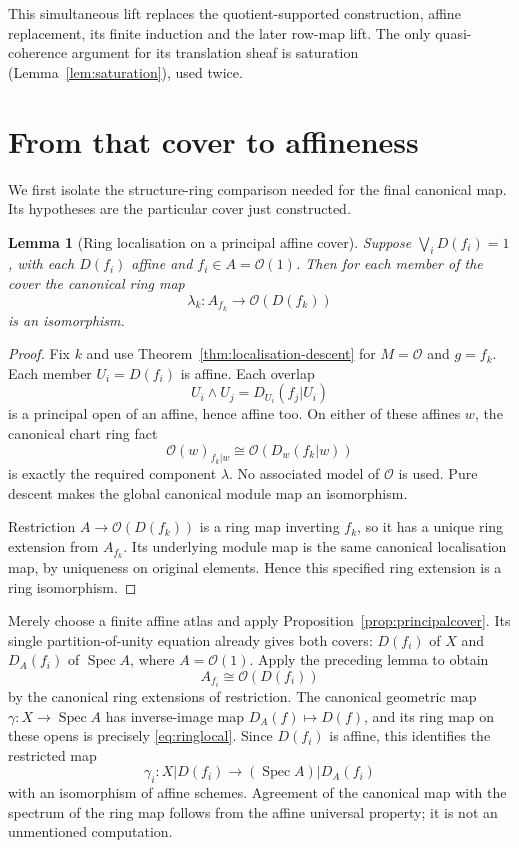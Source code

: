\documentclass[11pt]{amsart}
\newtheorem{lemma}[theorem]{Lemma}
\theoremstyle{definition}\newtheorem{definition}[theorem]{Definition}
\theoremstyle{remark}\newtheorem{remark}[theorem]{Remark}
\newcommand{\OO}{\mathcal O}
\newcommand{\Spec}{\operatorname{Spec}}
\begin{document}
This simultaneous lift replaces the quotient-supported construction,
affine replacement, its finite induction and the later row-map lift.
The only quasi-coherence argument for its translation sheaf is
saturation (Lemma~\ref{lem:saturation}), used twice.

\section{From that cover to affineness}\label{sec:finish}
We first isolate the structure-ring comparison needed for the final
canonical map. Its hypotheses are the particular cover just constructed.

\begin{lemma}[Ring localisation on a principal affine cover]
\label{lem:principal-ring-localisation}
Suppose $\bigvee_i D(f_i)=1$, with each $D(f_i)$ affine and
$f_i\in A=\OO(1)$. Then for each member of the cover the canonical
ring map
\[
 \lambda_k:A_{f_k}\longrightarrow\OO(D(f_k))
\]
is an isomorphism.
\end{lemma}
\begin{proof}
Fix $k$ and use Theorem~\ref{thm:localisation-descent} for $M=\OO$
and $g=f_k$. Each member $U_i=D(f_i)$ is affine. Each overlap
\[
 U_i\wedge U_j=D_{U_i}(f_j|U_i)
\]
is a principal open of an affine, hence affine too. On either of these
affines $w$, the canonical chart ring fact
\[
 \OO(w)_{f_k|w}\cong\OO(D_w(f_k|w))
\]
is exactly the required component $\lambda$. No associated model
of $\OO$ is used. Pure descent makes the global canonical module
map an isomorphism.

Restriction $A\to\OO(D(f_k))$ is a ring map inverting $f_k$,
so it has a unique ring extension from $A_{f_k}$. Its underlying
module map is the same canonical localisation map, by uniqueness
on original elements. Hence this specified ring extension is a ring
isomorphism.
\end{proof}

Merely choose a finite affine atlas and apply
Proposition~\ref{prop:principalcover}. Its single partition-of-unity
equation already gives both covers: $D(f_i)$ of $X$ and $D_A(f_i)$
of $\Spec A$, where $A=\OO(1)$. Apply the preceding lemma to obtain
\begin{equation}\label{eq:ringlocal}
 A_{f_i}\cong\OO(D(f_i))
\end{equation}
by the canonical ring extensions of restriction.
The canonical geometric map
$\gamma:X\to\Spec A$ has inverse-image map
$D_A(f)\mapsto D(f)$, and its ring map on these opens is precisely
\eqref{eq:ringlocal}. Since $D(f_i)$ is affine, this identifies
the restricted map
\[
 \gamma_i:X|D(f_i)\longrightarrow(\Spec A)|D_A(f_i)
\]
with an isomorphism of affine schemes. Agreement of the canonical
map with the spectrum of the ring map follows from the affine
universal property; it is not an unmentioned computation.
\end{document}
